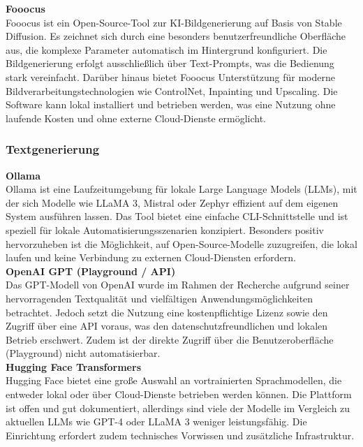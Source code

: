 \documentclass[a4paper,12pt]{article}
\begin{document}
\textbf{Fooocus} \\
Fooocus ist ein Open-Source-Tool zur KI-Bildgenerierung auf Basis von Stable Diffusion. Es zeichnet sich durch eine besonders benutzerfreundliche Oberfläche aus, die komplexe Parameter automatisch im Hintergrund konfiguriert. Die Bildgenerierung erfolgt ausschließlich über Text-Prompts, was die Bedienung stark vereinfacht.
Darüber hinaus bietet Fooocus Unterstützung für moderne Bildverarbeitungstechnologien wie ControlNet, Inpainting und Upscaling. Die Software kann lokal installiert und betrieben werden, was eine Nutzung ohne laufende Kosten und ohne externe Cloud-Dienste ermöglicht.
\\

\subsubsection{Textgenerierung}

\textbf{Ollama} \\
Ollama ist eine Laufzeitumgebung für lokale Large Language Models (LLMs), mit der sich Modelle wie LLaMA 3, Mistral oder Zephyr effizient auf dem eigenen System ausführen lassen. Das Tool bietet eine einfache CLI-Schnittstelle und ist speziell für lokale Automatisierungsszenarien konzipiert. Besonders positiv hervorzuheben ist die Möglichkeit, auf Open-Source-Modelle zuzugreifen, die lokal laufen und keine Verbindung zu externen Cloud-Diensten erfordern.
\\

\textbf{OpenAI GPT (Playground / API)} \\
Das GPT-Modell von OpenAI wurde im Rahmen der Recherche aufgrund seiner hervorragenden Textqualität und vielfältigen Anwendungsmöglichkeiten betrachtet. Jedoch setzt die Nutzung eine kostenpflichtige Lizenz sowie den Zugriff über eine API voraus, was den datenschutzfreundlichen und lokalen Betrieb erschwert. Zudem ist der direkte Zugriff über die Benutzeroberfläche (Playground) nicht automatisierbar.
\\

\textbf{Hugging Face Transformers} \\
Hugging Face bietet eine große Auswahl an vortrainierten Sprachmodellen, die entweder lokal oder über Cloud-Dienste betrieben werden können. Die Plattform ist offen und gut dokumentiert, allerdings sind viele der Modelle im Vergleich zu aktuellen LLMs wie GPT-4 oder LLaMA 3 weniger leistungsfähig. Die Einrichtung erfordert zudem technisches Vorwissen und zusätzliche Infrastruktur.
\\
\end{document}
